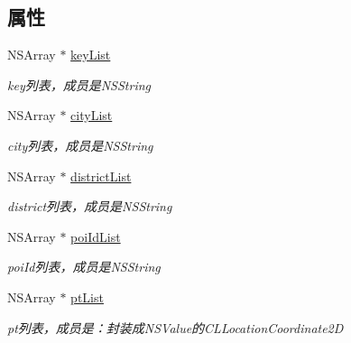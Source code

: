 \subsection*{属性}
\begin{DoxyCompactItemize}
\item 
\hypertarget{interface_b_m_k_suggestion_result_a799c815afa6706915ba59cb1b917696f}{}N\+S\+Array $\ast$ \hyperlink{interface_b_m_k_suggestion_result_a799c815afa6706915ba59cb1b917696f}{key\+List}\label{interface_b_m_k_suggestion_result_a799c815afa6706915ba59cb1b917696f}

\begin{DoxyCompactList}\small\item\em key列表，成员是\+N\+S\+String \end{DoxyCompactList}\item 
\hypertarget{interface_b_m_k_suggestion_result_a84e062c301ca7d07ebd586cbbb995c8c}{}N\+S\+Array $\ast$ \hyperlink{interface_b_m_k_suggestion_result_a84e062c301ca7d07ebd586cbbb995c8c}{city\+List}\label{interface_b_m_k_suggestion_result_a84e062c301ca7d07ebd586cbbb995c8c}

\begin{DoxyCompactList}\small\item\em city列表，成员是\+N\+S\+String \end{DoxyCompactList}\item 
\hypertarget{interface_b_m_k_suggestion_result_ac60b5de3361f806d6bc4266a5c450d42}{}N\+S\+Array $\ast$ \hyperlink{interface_b_m_k_suggestion_result_ac60b5de3361f806d6bc4266a5c450d42}{district\+List}\label{interface_b_m_k_suggestion_result_ac60b5de3361f806d6bc4266a5c450d42}

\begin{DoxyCompactList}\small\item\em district列表，成员是\+N\+S\+String \end{DoxyCompactList}\item 
\hypertarget{interface_b_m_k_suggestion_result_a210e3e5a9815f2c24f889ea92ffe2598}{}N\+S\+Array $\ast$ \hyperlink{interface_b_m_k_suggestion_result_a210e3e5a9815f2c24f889ea92ffe2598}{poi\+Id\+List}\label{interface_b_m_k_suggestion_result_a210e3e5a9815f2c24f889ea92ffe2598}

\begin{DoxyCompactList}\small\item\em poi\+Id列表，成员是\+N\+S\+String \end{DoxyCompactList}\item 
\hypertarget{interface_b_m_k_suggestion_result_a5d373e7b6d1e4c5f2159f4833a0c0ec5}{}N\+S\+Array $\ast$ \hyperlink{interface_b_m_k_suggestion_result_a5d373e7b6d1e4c5f2159f4833a0c0ec5}{pt\+List}\label{interface_b_m_k_suggestion_result_a5d373e7b6d1e4c5f2159f4833a0c0ec5}

\begin{DoxyCompactList}\small\item\em pt列表，成员是：封装成\+N\+S\+Value的\+C\+L\+Location\+Coordinate2\+D \end{DoxyCompactList}\end{DoxyCompactItemize}


